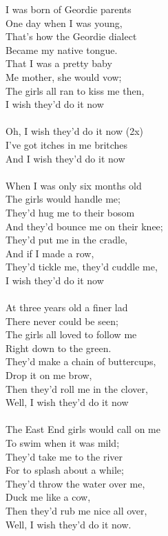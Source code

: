 \documentclass[twoside,13pt,openany,letterpaper]{memoir}%
\begin{document}
I was born of Geordie parents\\
One day when I was young,\\
That's how the Geordie dialect\\
Became my native tongue.\\
That I was a pretty baby\\
Me mother, she would vow;\\
The girls all ran to kiss me then,\\
I wish they'd do it now\\
\\
\chorusmarker
Oh, I wish they'd do it now (2x)\\
I've got itches in me britches\\
And I wish they'd do it now\\
\\
When I was only six months old\\
The girls would handle me;\\
They'd hug me to their bosom\\
And they'd bounce me on their knee;\\
They'd put me in the cradle,\\
And if I made a row,\\
They'd tickle me, they'd cuddle me,\\
I wish they'd do it now\\
\\
At three years old a finer lad\\
There never could be seen;\\
The girls all loved to follow me\\
Right down to the green.\\
They'd make a chain of buttercups,\\
Drop it on me brow,\\
Then they'd roll me in the clover,\\
Well, I wish they'd do it now\\
\\
The East End girls would call on me\\
To swim when it was mild;\\
They'd take me to the river\\
For to splash about a while;\\
They'd throw the water over me,\\
Duck me like a cow,\\
Then they'd rub me nice all over,\\
Well, I wish they'd do it now.\\
\end{document}
